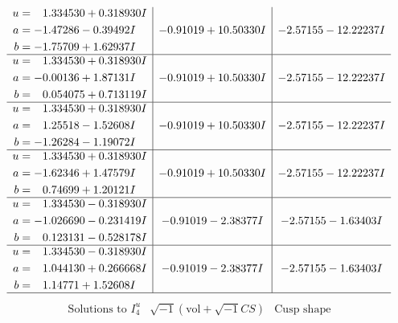 \documentclass[1p]{elsarticle_modified}
\theoremstyle{definition}
\newcommand{\I}{\sqrt{-1}}
\begin{document}
$$\begin{array}{c|c|c}
\begin{aligned}
u &= \phantom{-}1.334530 + 0.318930 I \\
a &= -1.47286 - 0.39492 I \\
b &= -1.75709 + 1.62937 I\end{aligned}
 & -0.91019 + 10.50330 I & -2.57155 - 12.22237 I \\ \hline\begin{aligned}
u &= \phantom{-}1.334530 + 0.318930 I \\
a &= -0.00136 + 1.87131 I \\
b &= \phantom{-}0.054075 + 0.713119 I\end{aligned}
 & -0.91019 + 10.50330 I & -2.57155 - 12.22237 I \\ \hline\begin{aligned}
u &= \phantom{-}1.334530 + 0.318930 I \\
a &= \phantom{-}1.25518 - 1.52608 I \\
b &= -1.26284 - 1.19072 I\end{aligned}
 & -0.91019 + 10.50330 I & -2.57155 - 12.22237 I \\ \hline\begin{aligned}
u &= \phantom{-}1.334530 + 0.318930 I \\
a &= -1.62346 + 1.47579 I \\
b &= \phantom{-}0.74699 + 1.20121 I\end{aligned}
 & -0.91019 + 10.50330 I & -2.57155 - 12.22237 I \\ \hline\begin{aligned}
u &= \phantom{-}1.334530 - 0.318930 I \\
a &= -1.026690 - 0.231419 I \\
b &= \phantom{-}0.123131 - 0.528178 I\end{aligned}
 & -0.91019 - 2.38377 I & -2.57155 - 1.63403 I \\ \hline\begin{aligned}
u &= \phantom{-}1.334530 - 0.318930 I \\
a &= \phantom{-}1.044130 + 0.266668 I \\
b &= \phantom{-}1.14771 + 1.52608 I\end{aligned}
 & -0.91019 - 2.38377 I & -2.57155 - 1.63403 I\\
 \hline 
 \end{array}$$\newpage$$\begin{array}{c|c|c}  
\text{Solutions to }I^u_{4}& \I (\text{vol} + \sqrt{-1}CS) & \text{Cusp shape}\\
 \hline 
\begin{aligned}

\end{aligned}
\end{array}$$
\end{document}
